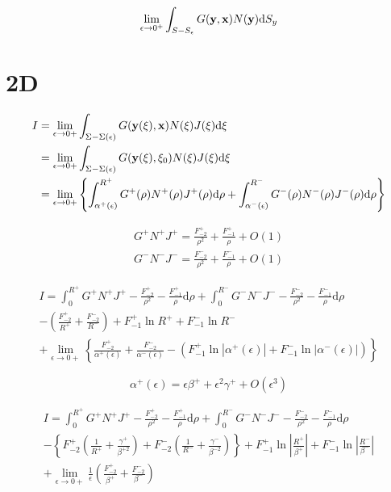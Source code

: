 \documentclass[a4paper,11pt,twoside]{article}
\newcommand{\td}{\mathrm{d}}
\begin{document}
\begin{equation}
\lim_{\epsilon\to0^+}\int_{S-S_{\epsilon}} G({\bf y}, {\bf x}) N({\bf y}) \td S_y
\end{equation}

\section{2D}

\begin{align}
I &= \lim_{\epsilon \to 0+} \int_{\Sigma-\Sigma(\epsilon)} G({\bf y}(\xi), {\bf x}) N(\xi) J(\xi) \td \xi \nonumber \\
&= \lim_{\epsilon \to 0+} \int_{\Sigma-\Sigma(\epsilon)} G({\bf y}(\xi), \xi_0) N(\xi) J(\xi) \td \xi \nonumber \\
&= \lim_{\epsilon \to 0+} \left\{ \int_{\alpha^+(\epsilon)}^{R^+} G^+(\rho) N^+(\rho) J^+(\rho) \td \rho +
\int_{\alpha^-(\epsilon)}^{R^-} G^-(\rho) N^-(\rho) J^-(\rho) \td \rho
\right\}
\end{align}

\begin{align}
G^+ N^+ J^+ = \frac{F_{-2}^+}{\rho^2} + \frac{F_{-1}^+}{\rho} + O(1) \nonumber \\
G^- N^- J^- = \frac{F_{-2}^-}{\rho^2} + \frac{F_{-1}^-}{\rho} + O(1)
\end{align}

\begin{multline}
I =
\int_{0}^{R^+} G^+ N^+ J^+ - \frac{F_{-2}^+}{\rho^2} - \frac{F_{-1}^+}{\rho} \td \rho +
\int_{0}^{R^-} G^- N^- J^- - \frac{F_{-2}^-}{\rho^2} - \frac{F_{-1}^-}{\rho} \td \rho \\
-
\left(
\frac{F_{-2}^+}{R^+}
+ \frac{F_{-2}^-}{R^-} 
\right)
+ F_{-1}^+ \ln R^+
+ F_{-1}^- \ln R^- \\
+
\lim_{\epsilon \to 0+}
\left\{
\frac{F_{-2}^+}{\alpha^+(\epsilon)}
+ \frac{F_{-2}^-}{\alpha^-(\epsilon)}
- \left(F_{-1}^+ \ln \left|\alpha^+(\epsilon) \right|
+ F_{-1}^- \ln \left|\alpha^-(\epsilon) \right|\right)
\right\}
\end{multline}

\begin{equation}
\alpha^+(\epsilon) =  \epsilon \beta^+ + \epsilon^2 \gamma^+ + O(\epsilon^3)
\end{equation}

\begin{multline}
I =
\int_{0}^{R^+} G^+ N^+ J^+ - \frac{F_{-2}^+}{\rho^2} - \frac{F_{-1}^+}{\rho} \td \rho +
\int_{0}^{R^-} G^- N^- J^- - \frac{F_{-2}^-}{\rho^2} - \frac{F_{-1}^-}{\rho} \td \rho \\
-
\left\{
F_{-2}^+\left(\frac{1}{R^+} + \frac{\gamma^+}{\beta^{+2}}\right)
+
F_{-2}^-\left(\frac{1}{R^-} + \frac{\gamma^-}{\beta^{-2}}\right)
\right\}
+ F_{-1}^+ \ln \left|\frac{R^+}{\beta^+}\right|
+ F_{-1}^- \ln \left|\frac{R^-}{\beta^-}\right| \\
+
\lim_{\epsilon \to 0+}
\frac{1}{\epsilon}
\left(
\frac{F_{-2}^+}{\beta^+}
+ \frac{F_{-2}^-}{\beta^-}
\right)
\end{multline}
\end{document}
